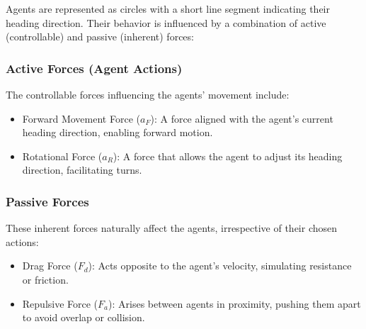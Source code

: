 \documentclass[9pt]{IEEEtran}
\begin{document}
Agents are represented as circles with a short line segment indicating their heading direction. Their behavior is influenced by a combination of active (controllable) and passive (inherent) forces:

\subsubsection{Active Forces (Agent Actions)}
The controllable forces influencing the agents' movement include: 
\begin{itemize} 
    \item Forward Movement Force ($a_F$): A force aligned with the agent's current heading direction, enabling forward motion. \item Rotational Force ($a_R$): A force that allows the agent to adjust its heading direction, facilitating turns.
\end{itemize}

\subsubsection{Passive Forces}
These inherent forces naturally affect the agents, irrespective of their chosen actions: 
\begin{itemize} 
    \item Drag Force ($F_d$): Acts opposite to the agent's velocity, simulating resistance or friction. 
    \item Repulsive Force ($F_a$): Arises between agents in proximity, pushing them apart to avoid overlap or collision.
\end{itemize}
\end{document}
